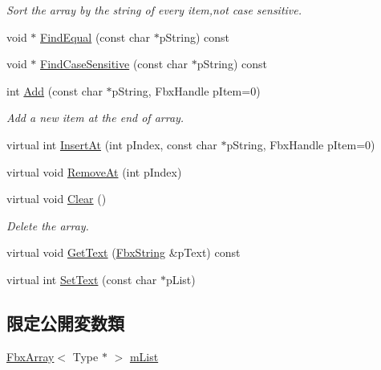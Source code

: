 \begin{Indent}
\begin{DoxyCompactItemize}
\begin{DoxyCompactList}\small\item\em Sort the array by the string of every item,not case sensitive. \end{DoxyCompactList}\item 
void $\ast$ \hyperlink{class_fbx_string_list_t_a476ea46cf72847c070af0868b187cef0}{Find\+Equal} (const char $\ast$p\+String) const
\item 
void $\ast$ \hyperlink{class_fbx_string_list_t_a3b5a6fa9a9e231c99f15b6493627663c}{Find\+Case\+Sensitive} (const char $\ast$p\+String) const
\item 
int \hyperlink{class_fbx_string_list_t_ace48eedb25e7393d546c914924355cd2}{Add} (const char $\ast$p\+String, Fbx\+Handle p\+Item=0)
\begin{DoxyCompactList}\small\item\em Add a new item at the end of array. \end{DoxyCompactList}\item 
virtual int \hyperlink{class_fbx_string_list_t_ad736ea0d13e3dd02874e8dff83ff41db}{Insert\+At} (int p\+Index, const char $\ast$p\+String, Fbx\+Handle p\+Item=0)
\item 
virtual void \hyperlink{class_fbx_string_list_t_afef2030e06b13d23e998cbc6ea6ff9a3}{Remove\+At} (int p\+Index)
\item 
virtual void \hyperlink{class_fbx_string_list_t_ac5bcede97ed831d4fe76f3087a63398e}{Clear} ()
\begin{DoxyCompactList}\small\item\em Delete the array. \end{DoxyCompactList}\item 
virtual void \hyperlink{class_fbx_string_list_t_a3b88147898d42dd276a73ff380dbe8d8}{Get\+Text} (\hyperlink{class_fbx_string}{Fbx\+String} \&p\+Text) const
\item 
virtual int \hyperlink{class_fbx_string_list_t_a02f67be1bc4175ece4f9aa62efc17441}{Set\+Text} (const char $\ast$p\+List)
\end{DoxyCompactItemize}
\end{Indent}
\subsection*{限定公開変数類}
\begin{DoxyCompactItemize}
\item 
\hyperlink{class_fbx_array}{Fbx\+Array}$<$ Type $\ast$ $>$ \hyperlink{class_fbx_string_list_t_a4e123cd88e7d73c0ce3ff22cc5f6e2cc}{m\+List}
\end{DoxyCompactItemize}


